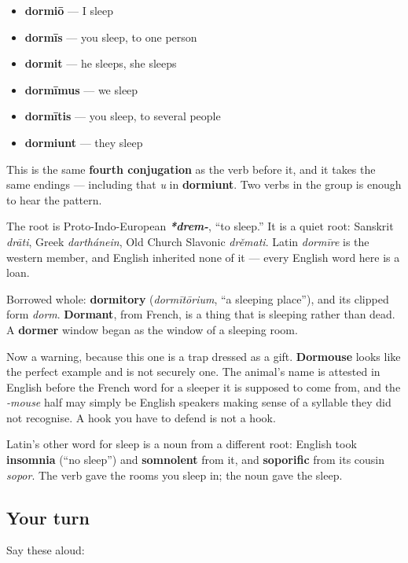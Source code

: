 \begin{itemize}
\raggedright
  \item \textbf{dormiō} — I sleep
  \item \textbf{dormīs} — you sleep, to one person
  \item \textbf{dormit} — he sleeps, she sleeps
  \item \textbf{dormīmus} — we sleep
  \item \textbf{dormītis} — you sleep, to several people
  \item \textbf{dormiunt} — they sleep
\end{itemize}

This is the same \textbf{fourth conjugation} as the verb before it, and it takes the same endings — including that \emph{u} in \textbf{dormiunt}. Two verbs in the group is enough to hear the pattern.

\begin{cousinweb}
The root is Proto-Indo-European \emph{\textbf{*drem-}}, \textquotedblleft{}to sleep.\textquotedblright{} It is a quiet root: Sanskrit \emph{drāti}, Greek \emph{darthánein}, Old Church Slavonic \emph{drěmati}. Latin \emph{dormīre} is the western member, and English inherited none of it — every English word here is a loan.

Borrowed whole: \textbf{dormitory} (\emph{dormītōrium}, \textquotedblleft{}a sleeping place\textquotedblright{}), and its clipped form \emph{dorm}. \textbf{Dormant}, from French, is a thing that is sleeping rather than dead. A \textbf{dormer} window began as the window of a sleeping room.

Now a warning, because this one is a trap dressed as a gift. \textbf{Dormouse} looks like the perfect example and is not securely one. The animal's name is attested in English before the French word for a sleeper it is supposed to come from, and the \emph{-mouse} half may simply be English speakers making sense of a syllable they did not recognise. A hook you have to defend is not a hook.

Latin's other word for sleep is a noun from a different root: English took \textbf{insomnia} (\textquotedblleft{}no sleep\textquotedblright{}) and \textbf{somnolent} from it, and \textbf{soporific} from its cousin \emph{sopor}. The verb gave the rooms you sleep in; the noun gave the sleep.
\end{cousinweb}

\subsection*{Your turn}
Say these aloud:

